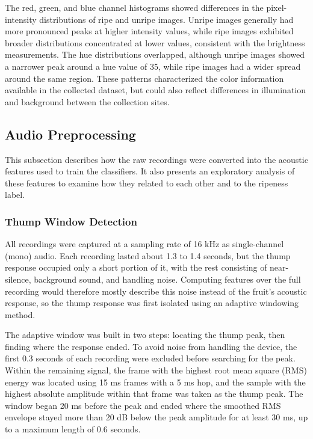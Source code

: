 \begin{thesisprose}
The red, green, and blue channel histograms showed differences in the pixel-intensity distributions of ripe and unripe images. Unripe images generally had more pronounced peaks at higher intensity values, while ripe images exhibited broader distributions concentrated at lower values, consistent with the brightness measurements. The hue distributions overlapped, although unripe images showed a narrower peak around a hue value of 35, while ripe images had a wider spread around the same region. These patterns characterized the color information available in the collected dataset, but could also reflect differences in illumination and background between the collection sites.

\subsection{Audio Preprocessing}

This subsection describes how the raw recordings were converted into the acoustic features used to train the classifiers. It also presents an exploratory analysis of these features to examine how they related to each other and to the ripeness label.

\subsubsection*{Thump Window Detection}

All recordings were captured at a sampling rate of 16 kHz as single-channel (mono) audio. Each recording lasted about 1.3 to 1.4 seconds, but the thump response occupied only a short portion of it, with the rest consisting of near-silence, background sound, and handling noise. Computing features over the full recording would therefore mostly describe this noise instead of the fruit’s acoustic response, so the thump response was first isolated using an adaptive windowing method.

The adaptive window was built in two steps: locating the thump peak, then finding where the response ended. To avoid noise from handling the device, the first 0.3 seconds of each recording were excluded before searching for the peak. Within the remaining signal, the frame with the highest root mean square (RMS) energy was located using 15 ms frames with a 5 ms hop, and the sample with the highest absolute amplitude within that frame was taken as the thump peak. The window began 20 ms before the peak and ended where the smoothed RMS envelope stayed more than 20 dB below the peak amplitude for at least 30 ms, up to a maximum length of 0.6 seconds.


\end{thesisprose}
